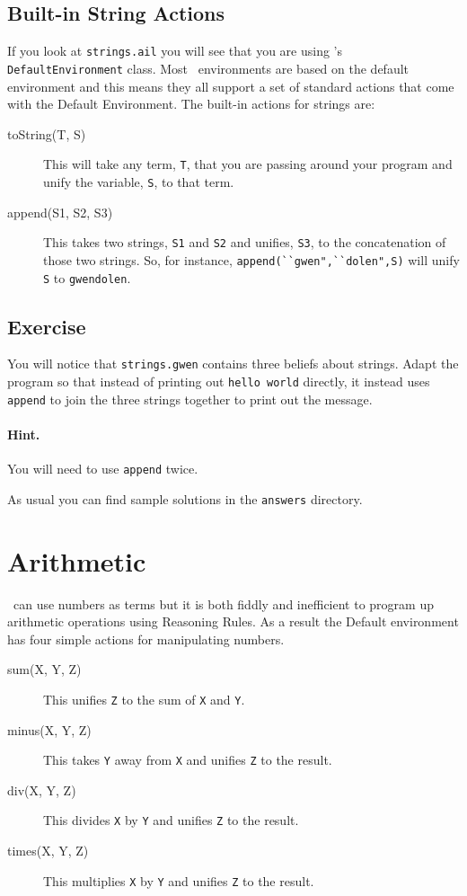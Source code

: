 \documentclass[a4]{article}
\begin{document}
\subsection{Built-in String Actions}
If you look at \texttt{strings.ail} you will see that you are using \ail's \texttt{DefaultEnvironment} class.  Most \gwendolen\ environments are based on the default environment and this means they all support a set of standard actions that come with the Default Environment.  The built-in actions for strings are:
\begin{description}
\item[toString(T, S)] This will take any term, \lstinline{T}, that you are passing around your program and unify the variable, \lstinline{S}, to that term.
\item[append(S1, S2, S3)]  This takes two strings, \lstinline{S1} and \lstinline{S2} and unifies, \lstinline{S3}, to the concatenation of those two strings.  So, for instance, \lstinline{append(``gwen",``dolen",S)} will unify \lstinline{S} to \lstinline{gwendolen}.
\end{description}

\subsection{Exercise}
You will notice that \texttt{strings.gwen} contains three beliefs about strings.  Adapt the program so that instead of printing out \texttt{hello world} directly, it instead uses \lstinline{append} to join the three strings together to print out the message.

\paragraph{Hint.} You will need to use \lstinline{append} twice.

As usual you can find sample solutions in the \texttt{answers} directory.

\section{Arithmetic}

\gwendolen\ can use numbers as terms but it is both fiddly and inefficient to program up arithmetic operations using Reasoning Rules.  As a result the Default environment has four simple actions for manipulating numbers.

\begin{description}
\item[sum(X, Y, Z)] This unifies \lstinline{Z} to the sum of \lstinline{X} and \lstinline{Y}.
\item[minus(X, Y, Z)] This takes \lstinline{Y} away from \lstinline{X} and unifies \lstinline{Z} to the result.
\item[div(X, Y, Z)] This divides \lstinline{X} by \lstinline{Y} and unifies \lstinline{Z} to the result.
\item[times(X, Y, Z)] This multiplies \lstinline{X} by \lstinline{Y} and unifies \lstinline{Z} to the result.
\end{description}
\end{document}
